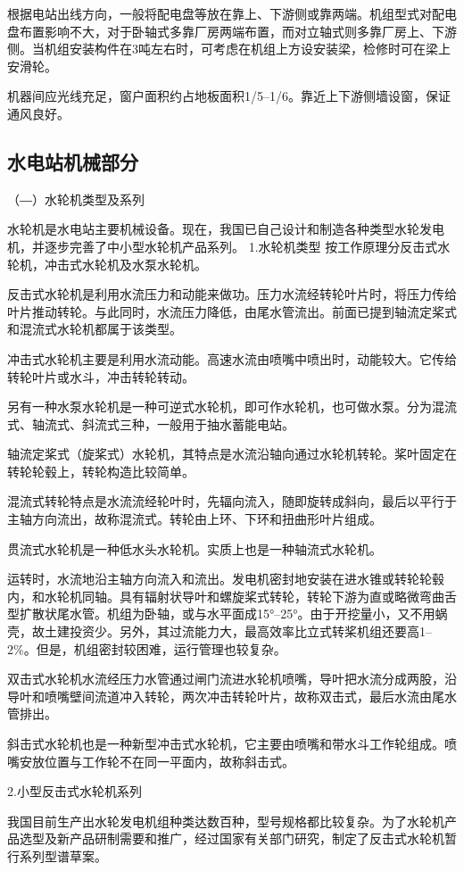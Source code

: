 \documentclass{ctexbook}
\begin{document}
根据电站出线方向，一般将配电盘等放在靠上、下游侧或靠两端。机组型式对配电盘布置影响不大，对于卧轴式多靠厂房两端布置，而对立轴式则多靠厂房上、下游侧。当机组安装构件在3吨左右时，可考虑在机组上方设安装梁，检修时可在梁上安滑轮。

机器间应光线充足，窗户面积约占地板面积1/5--1/6。靠近上下游侧墙设窗，保证通风良好。
\subsection{水电站机械部分}
（―）水轮机类型及系列

水轮机是水电站主要机械设备。现在，我国已自己设计和制造各种类型水轮发电机，并逐步完善了中小型水轮机产品系列。
1.水轮机类型
按工作原理分反击式水轮机，冲击式水轮机及水泵水轮机。

反击式水轮机是利用水流压力和动能来做功。压力水流经转轮叶片时，将压力传给叶片推动转轮。与此同时，水流压力降低，由尾水管流出。前面已提到轴流定桨式和混流式水轮机都属于该类型。

冲击式水轮机主要是利用水流动能。高速水流由喷嘴中喷出时，动能较大。它传给转轮叶片或水斗，冲击转轮转动。

另有一种水泵水轮机是一种可逆式水轮机，即可作水轮机，也可做水泵。分为混流式、轴流式、斜流式三种，一般用于抽水蓄能电站。

轴流定桨式（旋桨式）水轮机，其特点是水流沿轴向通过水轮机转轮。桨叶固定在转轮轮毂上，转轮构造比较简单。

混流式转轮特点是水流流经轮叶时，先辐向流入，随即旋转成斜向，最后以平行于主轴方向流出，故称混流式。转轮由上环、下环和扭曲形叶片组成。

贯流式水轮机是一种低水头水轮机。实质上也是一种轴流式水轮机。

运转时，水流地沿主轴方向流入和流出。发电机密封地安装在进水锥或转轮轮毂内，和水轮机同轴。具有辐射状导叶和螺旋桨式转轮，转轮下游为直或略微弯曲舌型扩散状尾水管。机组为卧轴，或与水平面成15°--25°。由于开挖量小，又不用蜗壳，故土建投资少。另外，其过流能力大，最高效率比立式转桨机组还要高1--2\%。但是，机组密封较困难，运行管理也较复杂。

双击式水轮机水流经压力水管通过闸门流进水轮机喷嘴，导叶把水流分成两股，沿导叶和喷嘴壁间流道冲入转轮，两次冲击转轮叶片，故称双击式，最后水流由尾水管排出。

斜击式水轮机也是一种新型冲击式水轮机，它主要由喷嘴和带水斗工作轮组成。喷嘴安放位置与工作轮不在同一平面内，故称斜击式。

2.小型反击式水轮机系列

我国目前生产出水轮发电机组种类达数百种，型号规格都比较复杂。为了水轮机产品选型及新产品研制需要和推广，经过国家有关部门研究，制定了反击式水轮机暂行系列型谱草案。
\end{document}
